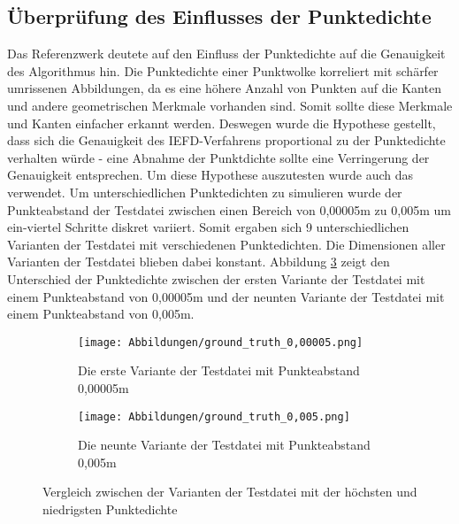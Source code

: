 \subsection{Überprüfung des Einflusses der Punktedichte} \label{test_2}
Das Referenzwerk deutete auf den Einfluss der Punktedichte auf die Genauigkeit des Algorithmus hin. Die Punktedichte einer Punktwolke korreliert mit schärfer umrissenen Abbildungen, da es eine höhere Anzahl von Punkten auf die Kanten und andere geometrischen Merkmale vorhanden sind. Somit sollte diese Merkmale und Kanten einfacher erkannt werden. Deswegen wurde die Hypothese gestellt, dass sich die Genauigkeit des IEFD-Verfahrens proportional zu der Punktedichte verhalten würde - eine Abnahme der Punktdichte sollte eine Verringerung der Genauigkeit entsprechen. Um diese Hypothese auszutesten wurde auch das \testcloud verwendet. Um unterschiedlichen Punktedichten zu simulieren wurde der Punkteabstand der Testdatei zwischen einen Bereich von 0,00005m zu 0,005m um ein-viertel Schritte diskret variiert. Somit ergaben sich 9 unterschiedlichen Varianten der Testdatei mit verschiedenen Punktedichten. Die Dimensionen aller Varianten der Testdatei blieben dabei konstant. Abbildung \ref{fig: testdata_pointdensity_comparision} zeigt den Unterschied der Punktedichte zwischen der ersten Variante der Testdatei mit einem Punkteabstand von 0,00005m und der neunten Variante der Testdatei mit einem Punkteabstand von 0,005m.

\begin{figure}[h]
	\centering
	\begin{subfigure}{0.49\textwidth}
		\texttt{[image: Abbildungen/ground\_truth\_0,00005.png]}
		\centering
		\caption{Die erste Variante der Testdatei mit Punkteabstand 0,00005m}
		\label{fig: testdata_0,00005m}
	\end{subfigure}
	\hfill
	\begin{subfigure}{0.49\textwidth}
		\texttt{[image: Abbildungen/ground\_truth\_0,005.png]}
		\centering
		\caption{Die neunte Variante der Testdatei mit Punkteabstand 0,005m}
		\label{fig: testdata_0,005m}
	\end{subfigure}
	\caption{Vergleich zwischen der Varianten der Testdatei mit der höchsten und niedrigsten Punktedichte}
	\label{fig: testdata_pointdensity_comparision}
\end{figure}

